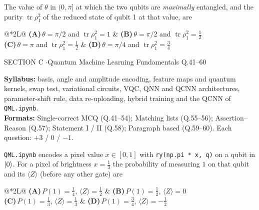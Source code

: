\documentclass[11pt,a4paper]{article}
\newcommand{\optlabel}[1]{\textbf{(#1)}}
\newenvironment{qitem}[1]{\begin{list}{}{\setlength{\leftmargin}{3.3em}\setlength{\labelwidth}{3.1em}%
  \setlength{\labelsep}{0.2em}\setlength{\topsep}{3pt}\setlength{\parsep}{3pt}}\item[\textbf{Q.#1}\hfill]}{\end{list}}
\newcommand{\qsep}{\par\vspace{2pt}{\color{black!15}\hrule}\vspace{4pt}}
\begin{document}
\begin{qitem}{40}
The value of $\theta$ in $(0, \pi]$ at which the two qubits are \emph{maximally} entangled, and the purity
$\operatorname{tr}\rho_1^2$ of the reduced state of qubit 1 at that value, are
\par\smallskip\noindent\begin{tabularx}{\linewidth}{@{}*{2}{L}@{}}
\optlabel{A}\,$\theta = \pi/2$ and $\operatorname{tr}\rho_1^2 = 1$ & \optlabel{B}\,$\theta = \pi/2$ and $\operatorname{tr}\rho_1^2 = \tfrac12$ \\[3pt]
\optlabel{C}\,$\theta = \pi$ and $\operatorname{tr}\rho_1^2 = \tfrac12$ & \optlabel{D}\,$\theta = \pi/4$ and $\operatorname{tr}\rho_1^2 = \tfrac34$
\end{tabularx}
\end{qitem}
\qsep

\newpage

\begin{sectionbanner}SECTION C \enspace$\cdot$\enspace Quantum Machine Learning Fundamentals \hfill Q.41--60\end{sectionbanner}

{\small \textbf{Syllabus:} basis, angle and amplitude encoding, feature maps and quantum kernels, swap test, variational circuits, VQC, QNN and QCNN architectures, parameter-shift rule, data re-uploading, hybrid training and the QCNN of \texttt{QML.ipynb}.\\ \textbf{Formats:} Single-correct MCQ (Q.41--54); Matching lists (Q.55--56); Assertion--Reason (Q.57); Statement I / II (Q.58); Paragraph based (Q.59--60). Each question: $+3$ / $0$ / $-1$.}
\par\medskip

\begin{qitem}{41}
\texttt{QML.ipynb} encodes a pixel value $x \in [0, 1]$ with \texttt{ry(np.pi * x, q)} on a qubit in $\ket0$. For a
pixel of brightness $x = \frac13$ the probability of measuring $1$ on that qubit and its $\langle Z\rangle$ (before any other gate) are
\par\smallskip\noindent\begin{tabularx}{\linewidth}{@{}*{2}{L}@{}}
\optlabel{A}\,$P(1) = \frac14$, $\langle Z\rangle = \frac12$ & \optlabel{B}\,$P(1) = \frac12$, $\langle Z\rangle = 0$ \\[3pt]
\optlabel{C}\,$P(1) = \frac13$, $\langle Z\rangle = \frac13$ & \optlabel{D}\,$P(1) = \frac34$, $\langle Z\rangle = -\frac12$
\end{tabularx}
\end{qitem}
\qsep
\end{document}
